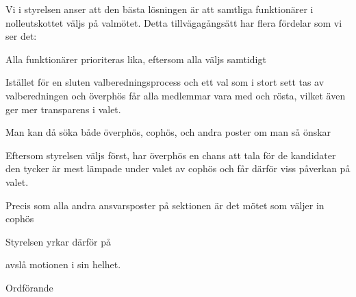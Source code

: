 \documentclass[../_main/handlingar.tex]{subfiles}
\begin{document}
\motionssvar
Vi i styrelsen anser att den bästa lösningen är att samtliga funktionärer i nolleutskottet väljs på valmötet. Detta tillvägagångsätt har flera fördelar som vi ser det:

\begin{dashlist}
	\item Alla funktionärer prioriteras lika, eftersom alla väljs samtidigt
	\item Istället för en sluten valberedningsprocess och ett val som i stort sett tas av valberedningen och överphös får alla medlemmar vara med och rösta, vilket även ger mer transparens i valet.
	\item Man kan då söka både överphös, cophös, och andra poster om man så önskar
	\item Eftersom styrelsen väljs först, har överphös en chans att tala för de kandidater den tycker är mest lämpade under valet av cophös och får därför viss påverkan på valet.
	\item Precis som alla andra ansvarsposter på sektionen är det mötet som väljer in cophös
\end{dashlist}

Styrelsen yrkar därför på

\begin{attsatser}
    \att avslå motionen i sin helhet.
\end{attsatser}


\begin{signatures}{1}
	\ist
	\signature{Daniel Bakic}{Ordförande}
\end{signatures}
\end{document}
